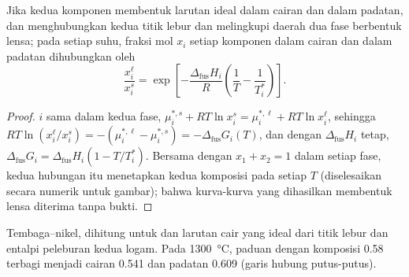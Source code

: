 \begin{proposition}[Lensa]\label{prop:b2:solid-liquid-diagrams:lens}
Jika kedua komponen membentuk larutan ideal dalam cairan dan dalam
padatan,  dan  menghubungkan kedua titik lebur dan
melingkupi daerah dua fase berbentuk lensa; pada setiap suhu, fraksi mol
$x_i$ setiap komponen dalam cairan dan dalam padatan dihubungkan oleh
\[
  \frac{x_i^{\ell}}{x_i^{s}} = \exp\left[-\frac{\Delta_{\text{fus}}H_i}{R}\left(\frac1T - \frac1{T_i^*}\right)\right] .
\]
\end{proposition}

\begin{proof}
 $i$ sama dalam kedua fase, $\mu_i^{*,s} +
RT\ln x_i^s = \mu_i^{*,\ell} + RT\ln x_i^\ell$, sehingga
$RT\ln(x_i^\ell/x_i^s) =
-(\mu_i^{*,\ell} - \mu_i^{*,s}) = -\Delta_{\text{fus}}G_i(T)$, dan dengan $\Delta_{\text{fus}}H_i$ tetap,
$\Delta_{\text{fus}}G_i = \Delta_{\text{fus}}H_i(1 - T/T_i^*)$. Bersama
dengan $x_1 + x_2 = 1$ dalam setiap fase, kedua hubungan itu menetapkan
kedua komposisi pada setiap $T$ (diselesaikan secara numerik untuk
gambar); bahwa kurva-kurva yang dihasilkan membentuk lensa diterima tanpa
bukti.
\end{proof}

\begin{omfigure}

{\small Tembaga--nikel, dihitung untuk  dan larutan cair yang
ideal dari titik lebur dan entalpi peleburan kedua logam. Pada
\qty{1300}{\degreeCelsius}, paduan dengan komposisi 0.58 terbagi menjadi
cairan 0.541 dan padatan 0.609 (garis hubung putus-putus).}
\end{omfigure}

